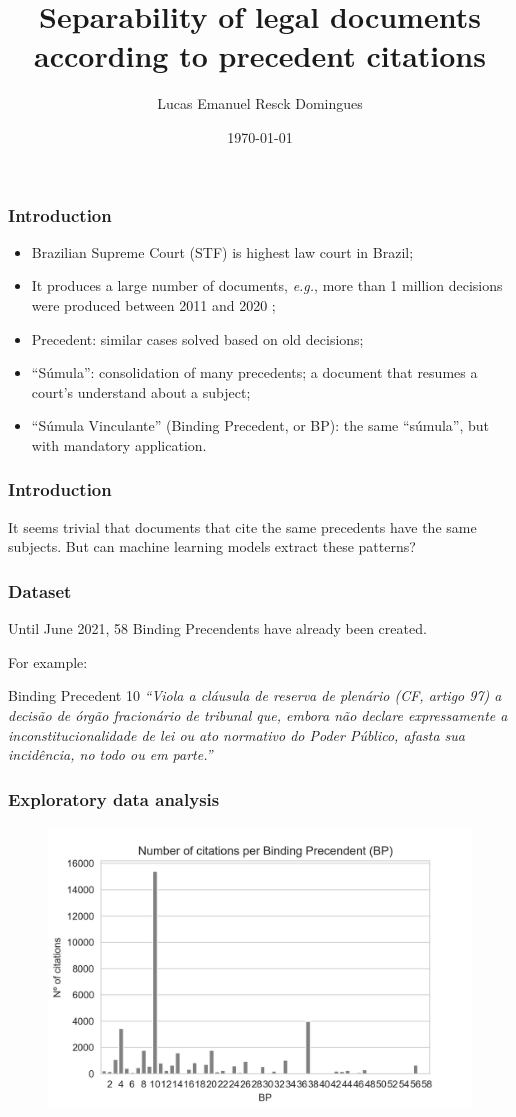 \documentclass{beamer}
\title{Separability of legal documents according to precedent citations}
\author{Lucas Emanuel Resck Domingues}
\institute[FGV-EMAp]{School of Applied Mathematics \\
Getulio Vargas Foundation}
\date{\today}
\newcommand{\eg}{\textit{e.g.}}
\begin{document}
    \frame{\titlepage}

    \begin{frame}
        \frametitle{Introduction}
        \begin{itemize}
            \item Brazilian Supreme Court (STF) is highest law court in Brazil; \pause
            \item It produces a large number of documents, \eg, more than 1 million decisions were produced between 2011 and 2020 \cite{stf}; \pause
            \item Precedent: similar cases solved based on old decisions;\pause
            \item ``Súmula'': consolidation of many precedents; a document that resumes a court's understand about a subject;\pause
            \item ``Súmula Vinculante'' (Binding Precedent, or BP): the same ``súmula'', but with mandatory application.
        \end{itemize}
    \end{frame}

    \begin{frame}
        \frametitle{Introduction}
        It seems trivial that documents that cite the same precedents have the same subjects. \pause 
        But can machine learning models extract these patterns?
    \end{frame}

    \begin{frame}
        \frametitle{Dataset}
        Until June 2021, 58 Binding Precendents have already been created. \pause

        For example:
        \begin{block}{Binding Precedent 10}
            \textit{``Viola a cláusula de reserva de plenário (CF, artigo 97) a decisão de órgão fracionário de tribunal que, embora não declare expressamente a inconstitucionalidade de lei ou ato normativo do Poder Público, afasta sua incidência, no todo ou em parte.''}
        \end{block}
    \end{frame}

    \begin{frame}
        \frametitle{Exploratory data analysis}
        \begin{figure}
            \centering
            \includegraphics[width=0.8\linewidth]{bp_citations.png}
        \end{figure}
    \end{frame}
\end{document}
